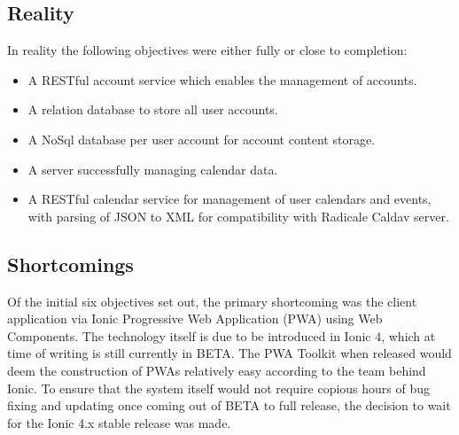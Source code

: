     \subsection{Reality}
    In reality the following objectives were either fully or close to completion:
    \begin{itemize}
    \item A RESTful account service which enables the management of accounts.
    \item A relation database to store all user accounts.
    \item A NoSql database per user account for account content storage.
    \item A server successfully managing calendar data.
    \item A RESTful calendar service for management of user calendars and events, with parsing of JSON to XML for compatibility with Radicale Caldav server. 
    \end{itemize}
    
    \subsection{Shortcomings}
    Of the initial six objectives set out, the primary shortcoming was the client application via Ionic Progressive Web Application (PWA) using Web Components. The technology itself is due to be introduced in Ionic 4, which at time of writing is still currently in BETA. The PWA Toolkit when released would deem the construction of PWAs relatively easy according to the team behind Ionic\cite{justinwillis}. To ensure that the system itself would not require copious hours of bug fixing and updating once coming out of BETA to full release, the decision to wait for the Ionic 4.x stable release was made.
    
    
    
    
    
    
    
    